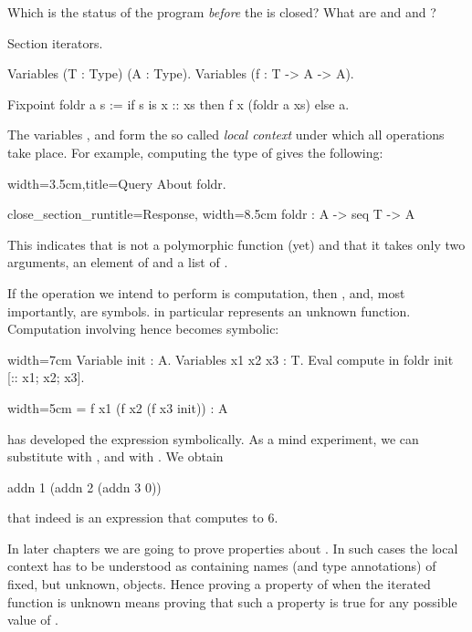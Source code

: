 Which is the status of the  program \emph{before} the
 is closed?  What are  and  and ?

\begin{coq}{}{}
Section iterators.

Variables (T : Type) (A : Type).
Variables (f : T -> A -> A).

Fixpoint foldr a s :=
  if s is x :: xs then f x (foldr a xs) else a.
\end{coq}

The variables ,  and  form the so called
\emph{local context} under which all operations take place.
For example, computing the type of  gives the following:

\begin{coq}{}{width=3.5cm,title=Query}
About foldr.
\end{coq}
\begin{coqout}{close_section_run}{title=Response, width=8.5cm}
foldr : A -> seq T -> A
\end{coqout}

This indicates that  is not a polymorphic function (yet)
and that it takes only two arguments, an element of  and
a list of .

If the operation we intend to perform is computation, then
,  and, most importantly,  are symbols.
  in particular represents an unknown function.
Computation involving  hence becomes symbolic:

\begin{coq}{}{width=7cm}
Variable init : A.
Variables x1 x2 x3 : T.
Eval compute in
  foldr init [:: x1; x2; x3].
\end{coq}
\begin{coqout}{}{width=5cm}
= f x1 (f x2 (f x3 init))
: A	
\end{coqout}

\Coq{} has developed the expression symbolically.  As a mind
experiment, we can substitute  with , and
\C{[:: x1; x2; x3]} with \C{[:: 1; 2; 3]}.  We obtain
\begin{coq}{}{}
addn 1 (addn 2 (addn 3 0))
\end{coq}
that indeed is an expression that computes to 6.

In later chapters we are going to prove properties about .
In such cases the local context has to be understood as containing
names (and type annotations) of fixed, but unknown, objects.
Hence proving a property of  when the iterated function
 is unknown means proving that such a property is true for any
possible value of .


